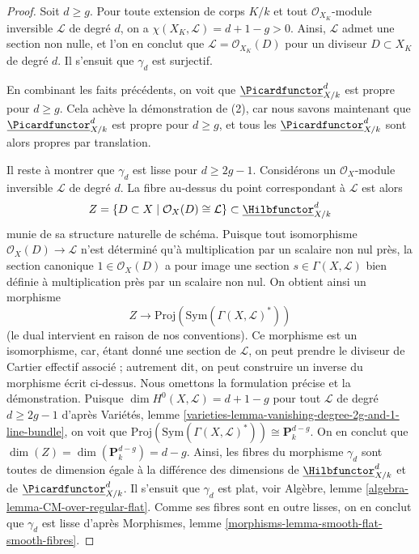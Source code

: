 \begin{proof}
\medskip\noindent
Soit $d \geq g$. Pour toute extension de corps $K/k$ et tout
$\mathcal{O}_{X_K}$-module inversible $\mathcal{L}$ de degré $d$, on a
$\chi(X_K, \mathcal{L}) = d + 1 - g > 0$. Ainsi, $\mathcal{L}$ admet une
section non nulle, et l'on en conclut que $\mathcal{L} = \mathcal{O}_{X_K}(D)$
pour un diviseur $D \subset X_K$ de degré $d$. Il s'ensuit que
$\gamma_d$ est surjectif.

\medskip\noindent
En combinant les faits précédents, on voit que
$\underline{\Picardfunctor}^d_{X/k}$ est propre pour $d \geq g$.
Cela achève la démonstration de (2), car nous savons maintenant que
$\underline{\Picardfunctor}^d_{X/k}$ est propre pour $d \geq g$, et
tous les $\underline{\Picardfunctor}^d_{X/k}$ sont alors propres par translation.

\medskip\noindent
Il reste à montrer que $\gamma_d$ est lisse pour $d \geq 2g - 1$.
Considérons un $\mathcal{O}_X$-module inversible $\mathcal{L}$ de degré
$d$. La fibre au-dessus du point correspondant à $\mathcal{L}$ est alors
$$
Z = \{D \subset X \mid \mathcal{O}_X(D) \cong \mathcal{L}\} \subset
\underline{\Hilbfunctor}^d_{X/k}
$$
munie de sa structure naturelle de schéma. Puisque tout isomorphisme
$\mathcal{O}_X(D) \to \mathcal{L}$ n'est déterminé qu'à
multiplication par un scalaire non nul près, la section canonique
$1 \in \mathcal{O}_X(D)$ a pour image une section
$s \in \Gamma(X, \mathcal{L})$ bien définie à multiplication
près par un scalaire non nul. On obtient ainsi un morphisme
$$
Z \longrightarrow
\text{Proj}(\text{Sym}(\Gamma(X, \mathcal{L})^*))
$$
(le dual intervient en raison de nos conventions). Ce morphisme est un isomorphisme,
car, étant donné une section de $\mathcal{L}$, on peut prendre le diviseur de Cartier
effectif associé ; autrement dit, on peut construire un inverse du
morphisme écrit ci-dessus. Nous omettons la formulation précise et la démonstration.
Puisque $\dim H^0(X, \mathcal{L}) = d + 1 - g$ pour tout
$\mathcal{L}$ de degré $d \geq 2g - 1$ d'après
Variétés, lemme \ref{varieties-lemma-vanishing-degree-2g-and-1-line-bundle},
on voit que $\text{Proj}(\text{Sym}(\Gamma(X, \mathcal{L})^*))
\cong \mathbf{P}^{d - g}_k$.
On en conclut que $\dim(Z) = \dim(\mathbf{P}^{d - g}_k) = d - g$.
Ainsi, les fibres du morphisme $\gamma_d$ sont toutes
de dimension égale à la différence des dimensions de
$\underline{\Hilbfunctor}^d_{X/k}$ et de $\underline{\Picardfunctor}^d_{X/k}$.
Il s'ensuit que $\gamma_d$ est plat, voir
Algèbre, lemme \ref{algebra-lemma-CM-over-regular-flat}.
Comme ses fibres sont en outre lisses, on en conclut que $\gamma_d$
est lisse d'après Morphismes, lemme \ref{morphisms-lemma-smooth-flat-smooth-fibres}.
\end{proof}





